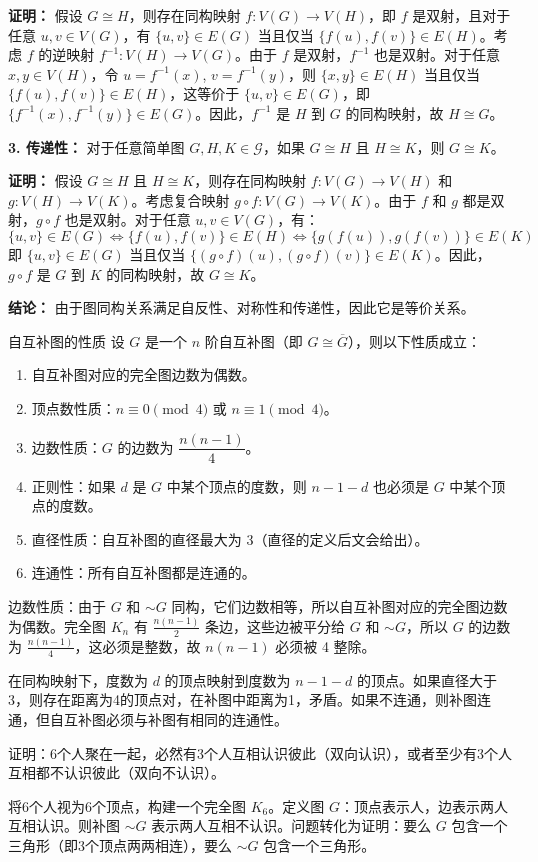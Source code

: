 \textbf{证明：}
假设 $G \cong H$，则存在同构映射 $f: V(G) \to V(H)$，即 $f$ 是双射，且对于任意 $u, v \in V(G)$，有 $\{u, v\} \in E(G)$ 当且仅当 $\{f(u), f(v)\} \in E(H)$。考虑 $f$ 的逆映射 $f^{-1}: V(H) \to V(G)$。由于 $f$ 是双射，$f^{-1}$ 也是双射。对于任意 $x, y \in V(H)$，令 $u = f^{-1}(x)$, $v = f^{-1}(y)$，则 $\{x, y\} \in E(H)$ 当且仅当 $\{f(u), f(v)\} \in E(H)$，这等价于 $\{u, v\} \in E(G)$，即 $\{f^{-1}(x), f^{-1}(y)\} \in E(G)$。因此，$f^{-1}$ 是 $H$ 到 $G$ 的同构映射，故 $H \cong G$。

\textbf{3. 传递性：} 对于任意简单图 $G, H, K \in \mathcal{G}$，如果 $G \cong H$ 且 $H \cong K$，则 $G \cong K$。

\textbf{证明：}
假设 $G \cong H$ 且 $H \cong K$，则存在同构映射 $f: V(G) \to V(H)$ 和 $g: V(H) \to V(K)$。考虑复合映射 $g \circ f: V(G) \to V(K)$。由于 $f$ 和 $g$ 都是双射，$g \circ f$ 也是双射。对于任意 $u, v \in V(G)$，有：
\[
\{u, v\} \in E(G) \iff \{f(u), f(v)\} \in E(H) \iff \{g(f(u)), g(f(v))\} \in E(K)
\]
即 $\{u, v\} \in E(G)$ 当且仅当 $\{(g \circ f)(u), (g \circ f)(v)\} \in E(K)$。因此，$g \circ f$ 是 $G$ 到 $K$ 的同构映射，故 $G \cong K$。

\textbf{结论：}
由于图同构关系满足自反性、对称性和传递性，因此它是等价关系。
\begin{theorem}{自互补图的性质}{}
设 $G$ 是一个 $n$ 阶自互补图（即 $G \cong \overline{G}$），则以下性质成立：
\begin{enumerate}[itemsep=2pt, parsep=2pt, topsep=5pt, label=(\arabic*)]
    \item 自互补图对应的完全图边数为偶数。
    \item 顶点数性质：$n \equiv 0 \pmod{4}$ 或 $n \equiv 1 \pmod{4}$。
    \item 边数性质：$G$ 的边数为 $\dfrac{n(n-1)}{4}$。
    \item 正则性：如果 $d$ 是 $G$ 中某个顶点的度数，则 $n-1-d$ 也必须是 $G$ 中某个顶点的度数。
    \item 直径性质：自互补图的直径最大为 3（直径的定义后文会给出）。
    \item 连通性：所有自互补图都是连通的。
\end{enumerate}
\end{theorem}
边数性质：由于 $G$ 和 $\sim G$ 同构，它们边数相等，所以自互补图对应的完全图边数为偶数。完全图 $K_n$ 有 $\frac{n(n-1)}{2}$ 条边，这些边被平分给 $G$ 和 $\sim G$，所以 $G$ 的边数为 $\frac{n(n-1)}{4}$，这必须是整数，故 $n(n-1)$ 必须被 4 整除。

在同构映射下，度数为 $d$ 的顶点映射到度数为 $n-1-d$ 的顶点。如果直径大于3，则存在距离为4的顶点对，在补图中距离为1，矛盾。如果不连通，则补图连通，但自互补图必须与补图有相同的连通性。
\begin{example}{}{}
    证明：6个人聚在一起，必然有3个人互相认识彼此（双向认识），或者至少有3个人互相都不认识彼此（双向不认识）。
\end{example}
将6个人视为6个顶点，构建一个完全图 $K_6$。定义图 $G$：顶点表示人，边表示两人互相认识。则补图 $\sim G$ 表示两人互相不认识。问题转化为证明：要么 $G$ 包含一个三角形（即3个顶点两两相连），要么 $\sim G$ 包含一个三角形。

